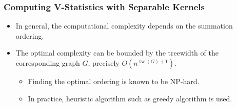 \documentclass[9pt]{beamer}
\theoremstyle{mystyle}
\theoremstyle{mystyletwo}
\begin{document}
\begin{frame}
\frametitle{Computing V-Statistics with Separable Kernels}
\begin{itemize}
\setlength\itemsep{1.5em}
        \item In general, the computational complexity depends on the summation ordering.
        \item The optimal complexity can be bounded by the treewidth of the corresponding graph $G$, precisely $O(n^{\operatorname{tw}(G)+1})$. 
        \vspace{1.5em}
            \begin{itemize}
            \setlength\itemsep{1.5em}
                \item Finding the optimal ordering is known to be NP-hard. 
                \item In practice, heuristic algorithm such as greedy algorithm is used.  
            \end{itemize}
\end{itemize}
    
\end{frame}
\end{document}
